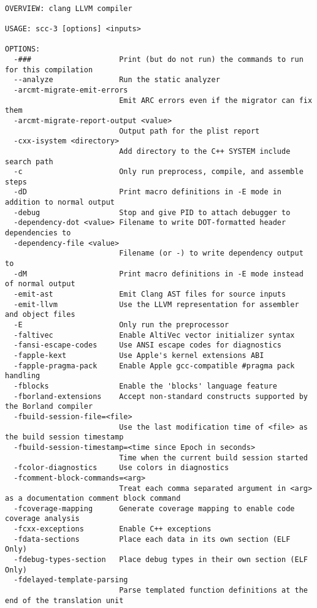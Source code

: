 \begin{verbatim}

OVERVIEW: clang LLVM compiler

USAGE: scc-3 [options] <inputs>

OPTIONS:
  -###                    Print (but do not run) the commands to run for this compilation
  --analyze               Run the static analyzer
  -arcmt-migrate-emit-errors
                          Emit ARC errors even if the migrator can fix them
  -arcmt-migrate-report-output <value>
                          Output path for the plist report
  -cxx-isystem <directory>
                          Add directory to the C++ SYSTEM include search path
  -c                      Only run preprocess, compile, and assemble steps
  -dD                     Print macro definitions in -E mode in addition to normal output
  -debug                  Stop and give PID to attach debugger to
  -dependency-dot <value> Filename to write DOT-formatted header dependencies to
  -dependency-file <value>
                          Filename (or -) to write dependency output to
  -dM                     Print macro definitions in -E mode instead of normal output
  -emit-ast               Emit Clang AST files for source inputs
  -emit-llvm              Use the LLVM representation for assembler and object files
  -E                      Only run the preprocessor
  -faltivec               Enable AltiVec vector initializer syntax
  -fansi-escape-codes     Use ANSI escape codes for diagnostics
  -fapple-kext            Use Apple's kernel extensions ABI
  -fapple-pragma-pack     Enable Apple gcc-compatible #pragma pack handling
  -fblocks                Enable the 'blocks' language feature
  -fborland-extensions    Accept non-standard constructs supported by the Borland compiler
  -fbuild-session-file=<file>
                          Use the last modification time of <file> as the build session timestamp
  -fbuild-session-timestamp=<time since Epoch in seconds>
                          Time when the current build session started
  -fcolor-diagnostics     Use colors in diagnostics
  -fcomment-block-commands=<arg>
                          Treat each comma separated argument in <arg> as a documentation comment block command
  -fcoverage-mapping      Generate coverage mapping to enable code coverage analysis
  -fcxx-exceptions        Enable C++ exceptions
  -fdata-sections         Place each data in its own section (ELF Only)
  -fdebug-types-section   Place debug types in their own section (ELF Only)
  -fdelayed-template-parsing
                          Parse templated function definitions at the end of the translation unit

\end{verbatim}
